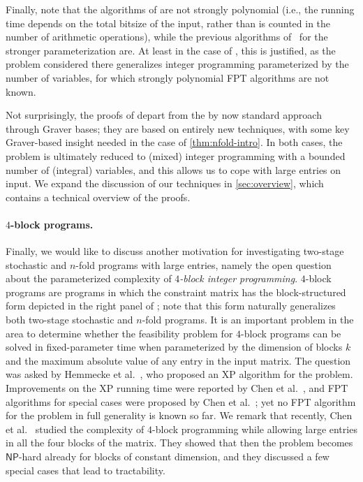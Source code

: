 \documentclass{article}
\begin{document}
Finally, note that the algorithms of  are not strongly polynomial (i.e., the running time depends on the total bitsize of the input, rather than is counted in the number of arithmetic operations), while the previous algorithms of~\cite{CslovjecsekEHRW21,CslovjecsekEPVW21,EisenbrandHK18,KouteckyLO18} for the stronger parameterization are. At least in the case of , this is justified, as the problem considered there generalizes integer programming parameterized by the number of variables, for which strongly polynomial FPT algorithms are not known.

Not surprisingly, the proofs of  depart from the by now standard approach through Graver bases; they are based on entirely new techniques, with some key Graver-based insight needed in the case of \cref{thm:nfold-intro}. In both cases, the problem is ultimately reduced to (mixed) integer programming with a bounded number of (integral) variables, and this allows us to cope with large entries on input. We expand the discussion of our techniques in \cref{sec:overview}, which contains a technical overview of the proofs.


\paragraph*{$4$-block programs.} Finally, we would like to discuss another motivation for investigating two-stage stochastic and $n$-fold programs with large entries, namely the open question about the parameterized complexity of {\em{$4$-block integer programming}}. $4$-block programs are programs in which the constraint matrix has the block-structured form depicted in the right panel of ; note that this form naturally generalizes both two-stage stochastic and $n$-fold programs. It is an important problem in the area to determine whether the feasibility problem for $4$-block programs can be solved in fixed-parameter time when parameterized by the dimension of blocks $k$ and the maximum absolute value of any entry in the input matrix. The question was asked by Hemmecke et al.~\cite{HemmeckeKW14}, who proposed an XP algorithm for the problem. Improvements on the XP running time were reported by Chen et al.~\cite{ChenKXS20}, and FPT algorithms for special cases were proposed by Chen et al.~\cite{ChenCZ21}; yet no FPT algorithm for the problem in full generality is known so far. We remark that recently, Chen et al.~\cite{ChenCZ22} studied the complexity of $4$-block programming while allowing large entries in all the four blocks of the matrix. They showed that then the problem becomes $\mathsf{NP}$-hard already for blocks of constant dimension, and they discussed a few special cases that lead to tractability.
\end{document}
